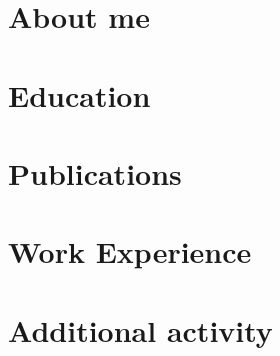 \documentclass[]{paper}
\begin{document}


\section{About me}


\section{Education}


\section{Publications}


\section{Work Experience}


\section{Additional activity}

\end{document}

